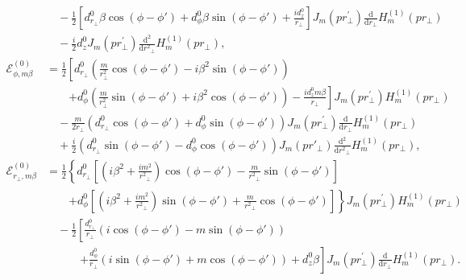 \documentclass[]{report}
\begin{document}
\begin{align}
&\quad -\frac{1}{2}\left[d^0_{r\!_\perp}\beta \cos(\phi\!-\!\phi') + d^0_\phi \beta\sin(\phi\!-\!\phi')+\frac{id^0_z}{r\!_\perp} \right] J_m\left( {pr\!_\perp^{\prime} }\right) \frac{\mathrm{d}}{\mathrm{d}r\!_\perp}H_m^{(1)}\left( pr\!_\perp \right)\nonumber\\
&\quad  -\frac{i}{2} d^0_z J_m\left( {pr\!_\perp^{\prime} }\right) \frac{\mathrm{d}^2}{\mathrm{d}r^2\!\!_\perp}H_m^{(1)}\left( pr\!_\perp \right), \\
\mathcal{E}_{\phi,m\beta}^{(0)} 
&= \frac{1}{2}\left[ d^0_{r\!_\perp}\left(\frac{m}{r\!_\perp^2}\cos(\phi\!-\!\phi') \!-\! i\beta^2\sin(\phi\!-\!\phi') \right)\right. \nonumber\\
&\quad\quad\left.+d^0_\phi\left(\frac{m}{r\!_\perp^2}\sin(\phi\!-\!\phi') \!+\! i\beta^2\cos(\phi\!-\!\phi') \right) \!-\! \frac{id^0_z m\beta}{r\!_\perp} \right] J_m\!\left( {pr\!_\perp^{\prime} }\right) H_m^{(1)}\!\left( pr_\perp \right) \nonumber\\
&\quad -\frac{m}{2r\!_\perp} \left(d^0_{r\!_\perp}\cos(\phi\!-\!\phi') \!+\! d^0_\phi\sin(\phi\!-\!\phi') \right) J_m\left( {pr\!_\perp^{\prime} }\right) \frac{\mathrm{d}}{\mathrm{d}r\!_\perp}H_m^{(1)}\left( pr_\perp \right)\nonumber\\
&\quad +\frac{i}{2}\left(d^0_{r\!_\perp}\sin(\phi\!-\!\phi') - d^0_\phi\cos(\phi\!-\!\phi')\right)  J_m(pr'\!_\perp) \frac{\mathrm{d}^2}{\mathrm{d}r^2\!\!_\perp}H_m^{(1)}(pr\!_\perp),\\
\mathcal{E}_{r\!_\perp,m\beta}^{(0)} 
&= \frac{1}{2}\left\{ d^0_{r\!_\perp}\left[ \left( i\beta^2+\frac{im^2}{r^2\!\!_\perp}\right)\cos(\phi\!-\!\phi')-\frac{m}{r^2\!\!_\perp}\sin(\phi\!-\!\phi')\right]\right.\nonumber\\
&\quad\quad\left.+d^0_\phi\left[ \left( i\beta^2+\frac{im^2}{r^2\!\!_\perp}\right)\sin(\phi\!-\!\phi')+\frac{m}{r^2\!\!_\perp}\cos(\phi\!-\!\phi')\right]\right\}J_m\left( {pr\!_\perp^{\prime} }\right) H_m^{(1)}\left( pr\!_\perp \right)\nonumber\\
&\quad -\frac{1}{2}\left[\frac{d^0_{r\!_\perp}}{r\!_\perp}\left(i\cos(\phi\!-\!\phi') \!-\! m\sin(\phi\!-\!\phi') \right)\right.\nonumber\\ &\quad\qquad\left.+\frac{d^0_\phi}{r\!_\perp}\left(i\sin(\phi\!-\!\phi') \!+\! m\cos(\phi\!-\!\phi') \right) \!+\! d^0_z \beta\right]\! J_m\!\left( {pr\!_\perp^{\prime} }\right)\! \frac{\mathrm{d}}{\mathrm{d}r\!_\perp}\! H_m^{(1)}\!\left( pr\!_\perp \right).
\end{align}
\end{document}
